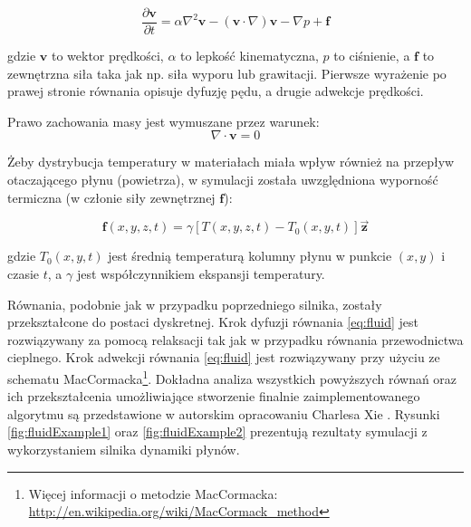 \begin{equation}
\label{eq:fluid}
\frac{\partial \mathbf{v}}{\partial t}
= \alpha \nabla^2 \mathbf{v} - (\mathbf{v} \cdot \nabla) \mathbf{v} - \nabla p 
+ \mathbf{f}
\end{equation}

gdzie $\mathbf{v}$ to wektor prędkości, $\alpha$ to lepkość kinematyczna,
$p$ to ciśnienie, a $\mathbf{f}$ to zewnętrzna siła taka jak np. siła wyporu
lub grawitacji. Pierwsze wyrażenie po prawej stronie równania opisuje
dyfuzję pędu, a drugie adwekcje prędkości.

Prawo zachowania masy jest wymuszane przez warunek:
\begin{equation}
\nabla \cdot \mathbf{v} = 0
\end{equation}

Żeby dystrybucja temperatury w materiałach miała wpływ również na przepływ
otaczającego płynu (powietrza), w symulacji została uwzględniona wyporność
termiczna (w członie siły zewnętrznej $\mathbf{f}$):

\begin{equation}
\mathbf{f}(x,y,z,t) = \gamma \left[ T(x,y,z,t) - T_0(x,y,t) \right] 
\mathbf{\vec{z}}
\end{equation}

gdzie $T_0(x,y,t)$ jest średnią temperaturą kolumny płynu w punkcie $(x,y)$
i czasie $t$, a $\gamma$ jest współczynnikiem ekspansji temperatury.

Równania, podobnie jak w przypadku poprzedniego silnika, zostały przekształcone
do postaci dyskretnej. Krok dyfuzji równania \ref{eq:fluid} jest rozwiązywany za
pomocą relaksacji tak jak w przypadku równania przewodnictwa cieplnego. Krok
adwekcji równania \ref{eq:fluid} jest rozwiązywany przy użyciu ze schematu
MacCormacka\footnote{Więcej informacji o metodzie MacCormacka:
\url{http://en.wikipedia.org/wiki/MacCormack_method}}. Dokładna analiza
wszystkich powyższych równań oraz ich przekształcenia umożliwiające stworzenie
finalnie zaimplementowanego algorytmu są przedstawione w autorskim opracowaniu
Charlesa Xie \cite{fluidEquation}. Rysunki \ref{fig:fluidExample1} oraz
\ref{fig:fluidExample2} prezentują rezultaty symulacji z wykorzystaniem
silnika dynamiki płynów.


